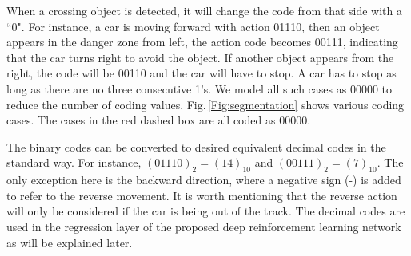 \documentclass{svproc}
\begin{document}
When a crossing object is detected, it will change the code from that side with a ``0". For instance, a car is moving forward with action 01110, then an object appears in the danger zone from left, the action code becomes 00111, indicating that the car turns right to avoid the object. If another object appears from the right, the code will be 00110 and the car will have to stop. A car has to stop as long as there are no three consecutive 1's. We model all such cases as 00000 to reduce the number of coding values. Fig.\,\ref{Fig:segmentation} shows various coding cases. The cases in the red dashed box are all coded as 00000.
	
The binary codes can be converted to desired equivalent decimal codes in the standard way. For instance, $(01110)_2=(14)_{10}$ and $(00111)_2=(7)_{10}$. The only exception here is the backward direction, where a negative sign (-) is added to refer to the reverse movement. It is worth mentioning that the reverse action will only be considered if the car is being out of the track. The decimal codes are used in the regression layer of the proposed deep reinforcement learning network as will be explained later. 
\end{document}
